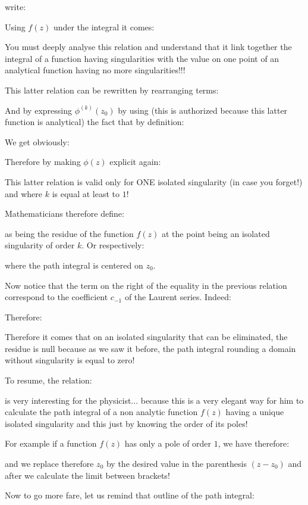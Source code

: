	write:
	
	Using $f(z)$ under the integral it comes:
	
	You must deeply analyse this relation and understand that it link together the integral of a function having singularities with the value on one point of an analytical function having no more singularities!!!
	
	This latter relation can be rewritten by rearranging terms:
	
	And by expressing $\phi^{(k)}(z_0)$ by using (this is authorized because this latter function is analytical) the fact that by definition:
	
	We get obviously:
	
	Therefore by making $\phi(z)$ explicit again:
	
	This latter relation is valid only for ONE isolated singularity (in case you forget!) and where $k$ is equal at least to $1$!

	Mathematicians therefore define:
	
	as being the residue of the function $f(z)$ at the point being an isolated singularity of order $k$. Or respectively:
	
	where the path integral is centered on $z_0$.
	
	Now notice that the term on the right of the equality in the previous relation correspond to the coefficient $c_{-1}$ of the Laurent series. Indeed:
	
	Therefore:
	
	\begin{tcolorbox}[title=Remark,colframe=black,arc=10pt]
	Therefore it comes that on an isolated singularity that can be eliminated, the residue is null because as we saw it before, the path integral rounding a domain without singularity is equal to zero!
	\end{tcolorbox}
	To resume, the relation:
	
	is very interesting for the physicist... because this is a very elegant way for him to calculate the path integral of a non analytic function $f(z)$ having a unique isolated singularity and this just by knowing the order of its poles!
	
	For example if a function $f(z)$ has only a pole of order $1$, we have therefore:
	
	and we replace therefore $z_0$ by the desired value in the parenthesis $(z-z_0)$ and after we calculate the limit between brackets!
	
	Now to go more fare, let us remind that outline of the path integral:
	
